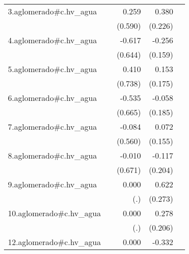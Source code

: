 {\begin{longtable}{l*{4}{D{.}{.}{-1}}}
\addlinespace
3.aglomerado#c.hv\_agua&                     &       0.259         &       0.380         &                     \\
            &                     &     (0.590)         &     (0.226)         &                     \\
\addlinespace
4.aglomerado#c.hv\_agua&                     &      -0.617         &      -0.256         &                     \\
            &                     &     (0.644)         &     (0.159)         &                     \\
\addlinespace
5.aglomerado#c.hv\_agua&                     &       0.410         &       0.153         &                     \\
            &                     &     (0.738)         &     (0.175)         &                     \\
\addlinespace
6.aglomerado#c.hv\_agua&                     &      -0.535         &      -0.058         &                     \\
            &                     &     (0.665)         &     (0.185)         &                     \\
\addlinespace
7.aglomerado#c.hv\_agua&                     &      -0.084         &       0.072         &                     \\
            &                     &     (0.560)         &     (0.155)         &                     \\
\addlinespace
8.aglomerado#c.hv\_agua&                     &      -0.010         &      -0.117         &                     \\
            &                     &     (0.671)         &     (0.204)         &                     \\
\addlinespace
9.aglomerado#c.hv\_agua&                     &       0.000         &       0.622\sym{*}  &                     \\
            &                     &         (.)         &     (0.273)         &                     \\
\addlinespace
10.aglomerado#c.hv\_agua&                     &       0.000         &       0.278         &                     \\
            &                     &         (.)         &     (0.206)         &                     \\
\addlinespace
12.aglomerado#c.hv\_agua&                     &       0.000         &      -0.332         &                     \\

\end{longtable}}
